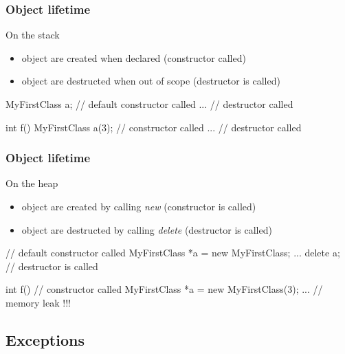 \begin{frame}[fragile]
  \frametitle{Object lifetime}
  \begin{block}{On the stack}
    \begin{itemize}
    \item object are created when declared (constructor called)
    \item object are destructed when out of scope (destructor is called)
    \end{itemize}
  \end{block}
  \begin{cppcode*}{}
    {
      MyFirstClass a; // default constructor called
      ...
    }  // destructor called

    int f() {
      MyFirstClass a(3); // constructor called
      ...
    } // destructor called
  \end{cppcode*}
\end{frame}

\begin{frame}[fragile]
  \frametitle{Object lifetime}
  \begin{block}{On the heap}
    \begin{itemize}
    \item object are created by calling {\it new} (constructor is called)
    \item object are destructed by calling {\it delete} (destructor is called)
    \end{itemize}
  \end{block}
  \begin{cppcode*}{}
    {
      // default constructor called
      MyFirstClass *a = new MyFirstClass;
      ...
      delete a; // destructor is called
    }

    int f() {
      // constructor called
      MyFirstClass *a = new MyFirstClass(3);
      ...
    } // memory leak !!!
  \end{cppcode*}
\end{frame}

\subsection{Exceptions}

